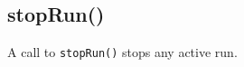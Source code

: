 


        \subsection{stopRun()}\label{sec:stopRun}
            A call to \texttt{stopRun()} stops any active run.\par\medskip

            


